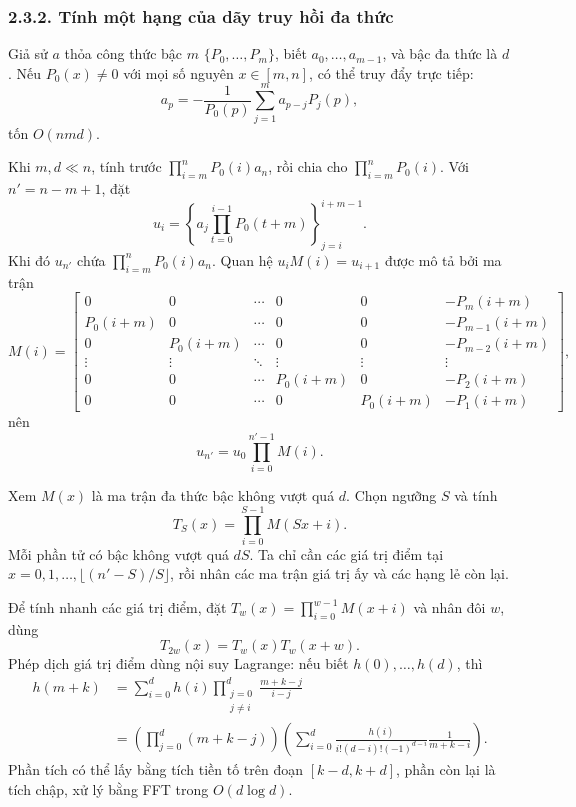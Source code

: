 \documentclass[11pt]{article}
\begin{document}
\subsubsection*{2.3.2. Tính một hạng của dãy truy hồi đa thức}

Giả sử \(a\) thỏa công thức bậc \(m\) \(\{P_0,\ldots,P_m\}\), biết
\(a_0,\ldots,a_{m-1}\), và bậc đa thức là \(d\). Nếu \(P_0(x)\ne0\) với mọi
số nguyên \(x\in[m,n]\), có thể truy đẩy trực tiếp:
\[
  a_p=-\frac{1}{P_0(p)}\sum_{j=1}^{m}a_{p-j}P_j(p),
\]
tốn \(O(nmd)\).

Khi \(m,d\ll n\), tính trước \(\prod_{i=m}^{n}P_0(i)a_n\), rồi chia cho
\(\prod_{i=m}^{n}P_0(i)\). Với \(n'=n-m+1\), đặt
\[
  u_i=\left\{a_j\prod_{t=0}^{i-1}P_0(t+m)\right\}_{j=i}^{i+m-1}.
\]
Khi đó \(u_{n'}\) chứa \(\prod_{i=m}^{n}P_0(i)a_n\). Quan hệ \(u_iM(i)=u_{i+1}\)
được mô tả bởi ma trận
\[
M(i)=
\begin{bmatrix}
0 & 0 & \cdots & 0 & 0 & -P_m(i+m)\\
P_0(i+m) & 0 & \cdots & 0 & 0 & -P_{m-1}(i+m)\\
0 & P_0(i+m) & \cdots & 0 & 0 & -P_{m-2}(i+m)\\
\vdots & \vdots & \ddots & \vdots & \vdots & \vdots\\
0 & 0 & \cdots & P_0(i+m) & 0 & -P_2(i+m)\\
0 & 0 & \cdots & 0 & P_0(i+m) & -P_1(i+m)
\end{bmatrix},
\]
nên
\[
  u_{n'}=u_0\prod_{i=0}^{n'-1}M(i).
\]

Xem \(M(x)\) là ma trận đa thức bậc không vượt quá \(d\). Chọn ngưỡng \(S\) và
tính
\[
  T_S(x)=\prod_{i=0}^{S-1}M(Sx+i).
\]
Mỗi phần tử có bậc không vượt quá \(dS\). Ta chỉ cần các giá trị điểm tại
\(x=0,1,\ldots,\lfloor(n'-S)/S\rfloor\), rồi nhân các ma trận giá trị ấy và
các hạng lẻ còn lại.

Để tính nhanh các giá trị điểm, đặt \(T_w(x)=\prod_{i=0}^{w-1}M(x+i)\) và nhân
đôi \(w\), dùng
\[
  T_{2w}(x)=T_w(x)T_w(x+w).
\]
Phép dịch giá trị điểm dùng nội suy Lagrange: nếu biết
\(h(0),\ldots,h(d)\), thì
\[
\begin{aligned}
h(m+k)
&=\sum_{i=0}^{d}h(i)\prod_{\substack{j=0\\j\ne i}}^{d}
  \frac{m+k-j}{i-j}\\
&=\left(\prod_{j=0}^{d}(m+k-j)\right)
  \left(\sum_{i=0}^{d}\frac{h(i)}{i!(d-i)!(-1)^{d-i}}\frac{1}{m+k-i}\right).
\end{aligned}
\]
Phần tích có thể lấy bằng tích tiền tố trên đoạn \([k-d,k+d]\), phần còn lại
là tích chập, xử lý bằng FFT trong \(O(d\log d)\).
\end{document}
